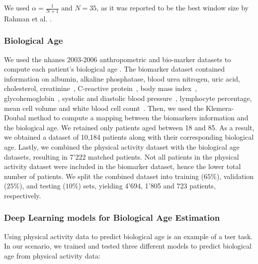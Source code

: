 We used $\alpha = \frac{1}{N+1}$ and $N=35$, as it was reported to be the best window size by Rahman et al. \cite{rahman_deep_2019}.

\subsubsection{Biological Age}
We used the \gls{nhanes} 2003-2006 anthropometric and bio-marker datasets to compute each patient's biological age \cite{kwon_toolkit_2021}.
The biomarker dataset contained information on albumin, alkaline phosphatase, blood urea nitrogen, uric acid, cholesterol, creatinine~\cite{cdc_biopro_d_2005}, C-reactive protein~\cite{cdc_crp_d_2005}, body mass index~\cite{cdc_bmx_c_2003}, glycohemoglobin~\cite{cdc_l10_c_2003}, systolic and diastolic blood pressure~\cite{cdc_bpq_c_2003}, lymphocyte percentage, mean cell volume and white blood cell count~\cite{cdc_l25_c_2003}.
% 
% 
% 
% 
% 
Then, we used the Klemera-Doubal method \cite{klemera_new_2006} to compute a mapping between the biomarkers information and the biological age. We retained only patients aged between 18 and 85. As a result, we obtained a dataset of 10,184 patients along with their corresponding biological age.
Lastly, we combined the physical activity dataset with the biological age datasets, resulting in 7'222 matched patients. Not all patients in the physical activity dataset were included in the biomarker dataset, hence the lower total number of patients. We split the combined dataset into training ($65\%$), validation ($25\%$), and testing ($10\%$) sets, yielding 4'694, 1'805 and 723 patients, respectively.
\subsubsection{Deep Learning models for Biological Age Estimation}
Using physical activity data to predict biological age is an example of a \gls{tser} task. In our scenario, we trained and tested three different models to predict biological age from physical activity data: 

